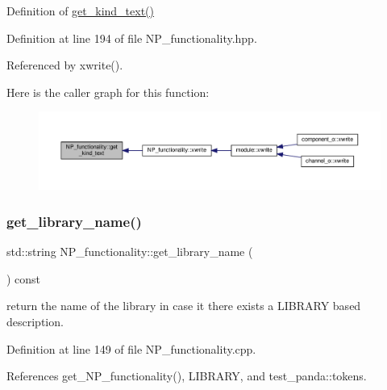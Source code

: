 Definition of \hyperlink{classNP__functionality_abb6480b8bf9edc6a6f1aaaf7781029ae}{get\+\_\+kind\+\_\+text()} 



Definition at line 194 of file N\+P\+\_\+functionality.\+hpp.



Referenced by xwrite().

Here is the caller graph for this function\+:
\nopagebreak
\begin{figure}[H]
\begin{center}
\leavevmode
\includegraphics[width=350pt]{d8/dda/classNP__functionality_abb6480b8bf9edc6a6f1aaaf7781029ae_icgraph}
\end{center}
\end{figure}
\mbox{\label{classNP__functionality_aa7c45178985092a5830506c425c42b63}} 
\subsubsection{\texorpdfstring{get\+\_\+library\+\_\+name()}{get\_library\_name()}}
{\footnotesize\ttfamily std\+::string N\+P\+\_\+functionality\+::get\+\_\+library\+\_\+name (\begin{DoxyParamCaption}{ }\end{DoxyParamCaption}) const}



return the name of the library in case it there exists a L\+I\+B\+R\+A\+RY based description. 



Definition at line 149 of file N\+P\+\_\+functionality.\+cpp.



References get\+\_\+\+N\+P\+\_\+functionality(), L\+I\+B\+R\+A\+RY, and test\+\_\+panda\+::tokens.

